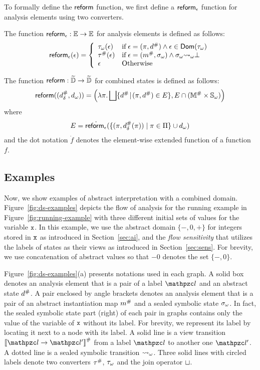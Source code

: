 To formally define the $\reform$ function, we first define a $\areform$ function
for analysis elements using two converters.
\begin{definition}[$\areform$]\label{def:areform}
  The function $\textsf{reform}_\epsilon: \mathbb{E} \rightarrow \mathbb{E}$ for analysis elements
  is defined as follows:
  \[
    \textsf{reform}_\epsilon(\epsilon) = \left\{
      \begin{array}{ll}
        {\tau}_\omega(\epsilon)
        & \text{if} \; \epsilon = (\pi, {d}^{\#}) \wedge \epsilon \in
        \textsf{Dom}({\tau}_\omega)\\
        {\tau}^{\#}(\epsilon)
        & \text{if} \; \epsilon = ({m}^{\#}, {\sigma}_\omega) \wedge {\sigma}_\omega {\leadsto}_\omega
        \bot\\
        \epsilon
        & \text{Otherwise}
      \end{array}
    \right.
  \]
\end{definition}
\begin{definition}[$\reform$]\label{def:reform}
  The  function $\textsf{reform}: \widetilde{\mathbb{D}} \rightarrow \widetilde{\mathbb{D}}$ for combined
  states is defined as follows:
  \[
    \textsf{reform}(({{d}^{\#}_\delta}, {{d}_\omega})) = \left(
      \lambda \pi. \bigsqcup \{ {d}^{\#} \!\mid\! (\pi, {d}^{\#}) \in E \},
      E \cap ({\mathbb{M}}^{\#} \times {\mathbb{S}}_\omega)
    \right)
  \]
  where
  \[
    E = \dot{\textsf{reform}_\epsilon}(\{ (\pi, {{d}^{\#}_\delta}(\pi)) \mid \pi \in \Pi \} \cup {{d}_\omega})
  \]
and the dot notation $\dot{f}$ denotes the element-wise extended function of a
function $f$.
\end{definition}


\subsection{Examples}
Now, we show examples of abstract interpretation with a combined domain.
Figure~\ref{fig:ds-examples} depicts the flow of analysis for the running
example in Figure~\ref{fig:running-example} with three different initial sets of
values for the variable $\texttt{x}$.  In this example, we use the abstract domain
$\{ -, 0, + \}$ for integers stored in $\texttt{x}$ as introduced in
Section~\ref{sec:ai}, and the \textit{flow sensitivity} that utilizes the
labels of states as their views as introduced in Section~\ref{sec:sens}.
For brevity, we use concatenation of abstract values so that
$-0$ denotes the set $\{ -, 0 \}$.

Figure~\ref{fig:ds-examples}(a) presents notations used in each graph. A solid
box denotes an analysis element that is a pair of a label $\lab$ and an abstract
state ${d}^{\#}$.  A pair enclosed by angle brackets denotes an analysis
element that is a pair of an abstract instantiation map ${m}^{\#}$ and a sealed
symbolic state ${\sigma}_\omega$.  In fact, the sealed symbolic state part (right) of
each pair in graphs contains only the value of the variable of $\texttt{x}$ without
its label.  For brevity, we represent its label by locating it next to
a node with its label.  A solid line is a view transition
$\viewtrans{\lab}{\lab'}$ from a label $\lab$ to another one $\lab'$.  A dotted
line is a sealed symbolic transition ${\leadsto}_\omega$.  Three solid lines with
circled labels denote two converters ${\tau}^{\#}$, ${\tau}_\omega$ and the join
operator $\sqcup$.

